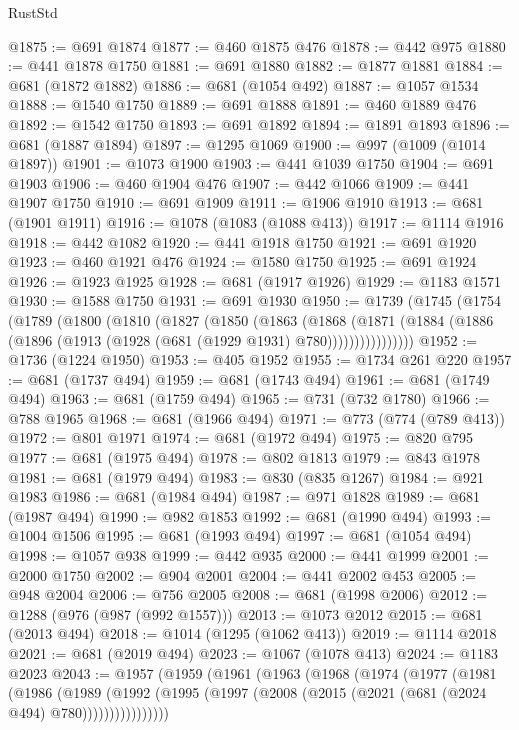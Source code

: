 \begin{lexlean}{RustStd}
\begin{coremodule}
{\begin{coremodule}
{{{{{{{{{{{{{{{{{{{{{{{{{@1875 := @691 @1874
@1877 := @460 @1875 @476
@1878 := @442 @975
@1880 := @441 @1878 @1750
@1881 := @691 @1880
@1882 := @1877 @1881
@1884 := @681 (@1872 @1882)
@1886 := @681 (@1054 @492)
@1887 := @1057 @1534
@1888 := @1540 @1750
@1889 := @691 @1888
@1891 := @460 @1889 @476
@1892 := @1542 @1750
@1893 := @691 @1892
@1894 := @1891 @1893
@1896 := @681 (@1887 @1894)
@1897 := @1295 @1069
@1900 := @997 (@1009 (@1014 @1897))
@1901 := @1073 @1900
@1903 := @441 @1039 @1750
@1904 := @691 @1903
@1906 := @460 @1904 @476
@1907 := @442 @1066
@1909 := @441 @1907 @1750
@1910 := @691 @1909
@1911 := @1906 @1910
@1913 := @681 (@1901 @1911)
@1916 := @1078 (@1083 (@1088 @413))
@1917 := @1114 @1916
@1918 := @442 @1082
@1920 := @441 @1918 @1750
@1921 := @691 @1920
@1923 := @460 @1921 @476
@1924 := @1580 @1750
@1925 := @691 @1924
@1926 := @1923 @1925
@1928 := @681 (@1917 @1926)
@1929 := @1183 @1571
@1930 := @1588 @1750
@1931 := @691 @1930
@1950 := @1739
    (@1745
      (@1754
        (@1789
          (@1800
            (@1810
              (@1827
                (@1850
                  (@1863
                    (@1868
                      (@1871
                        (@1884 (@1886 (@1896 (@1913 (@1928 (@681 (@1929 @1931) @780))))))))))))))))
@1952 := @1736 (@1224 @1950)
@1953 := @405 @1952
@1955 := @1734 @261 @220
@1957 := @681 (@1737 @494)
@1959 := @681 (@1743 @494)
@1961 := @681 (@1749 @494)
@1963 := @681 (@1759 @494)
@1965 := @731 (@732 @1780)
@1966 := @788 @1965
@1968 := @681 (@1966 @494)
@1971 := @773 (@774 (@789 @413))
@1972 := @801 @1971
@1974 := @681 (@1972 @494)
@1975 := @820 @795
@1977 := @681 (@1975 @494)
@1978 := @802 @1813
@1979 := @843 @1978
@1981 := @681 (@1979 @494)
@1983 := @830 (@835 @1267)
@1984 := @921 @1983
@1986 := @681 (@1984 @494)
@1987 := @971 @1828
@1989 := @681 (@1987 @494)
@1990 := @982 @1853
@1992 := @681 (@1990 @494)
@1993 := @1004 @1506
@1995 := @681 (@1993 @494)
@1997 := @681 (@1054 @494)
@1998 := @1057 @938
@1999 := @442 @935
@2000 := @441 @1999
@2001 := @2000 @1750
@2002 := @904 @2001
@2004 := @441 @2002 @453
@2005 := @948 @2004
@2006 := @756 @2005
@2008 := @681 (@1998 @2006)
@2012 := @1288 (@976 (@987 (@992 @1557)))
@2013 := @1073 @2012
@2015 := @681 (@2013 @494)
@2018 := @1014 (@1295 (@1062 @413))
@2019 := @1114 @2018
@2021 := @681 (@2019 @494)
@2023 := @1067 (@1078 @413)
@2024 := @1183 @2023
@2043 := @1957
    (@1959
      (@1961
        (@1963
          (@1968
            (@1974
              (@1977
                (@1981
                  (@1986
                    (@1989
                      (@1992
                        (@1995 (@1997 (@2008 (@2015 (@2021 (@681 (@2024 @494) @780))))))))))))))))
}}}}}}}}}}}}}}}}}}}}}}}}}
\end{coremodule}}
\end{coremodule}
\end{lexlean}
